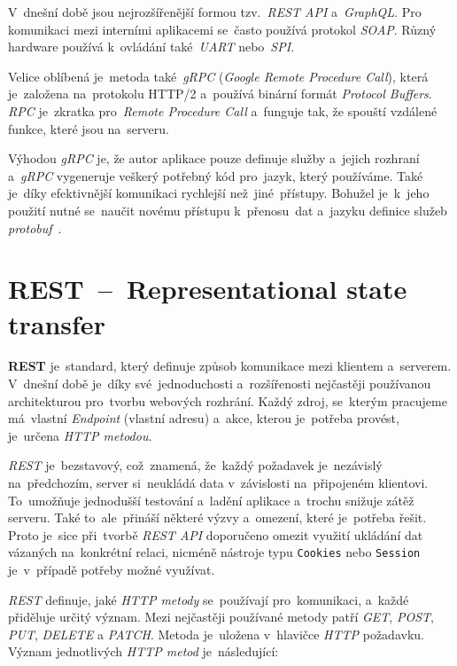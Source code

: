 \documentclass[11pt,a4paper]{report}
\begin{document}
            V~dnešní době jsou nejrozšířenější formou tzv.~\emph{REST API} a~\emph{GraphQL}. Pro komunikaci mezi interními aplikacemi se~často používá protokol \emph{SOAP}. Různý hardware používá k~ovládání také~\emph{UART} nebo~\emph{SPI}.

            Velice oblíbená je~metoda také~\emph{gRPC} (\emph{Google Remote Procedure Call}), která je~založena na~protokolu HTTP/2 a~používá binární formát \emph{Protocol Buffers}. \emph{RPC} je~zkratka pro~\emph{Remote Procedure Call} a~funguje tak, že spouští vzdálené funkce, které jsou na~serveru.
            
            Výhodou \emph{gRPC} je, že autor aplikace pouze definuje služby a~jejich rozhraní a~\emph{gRPC} vygeneruje veškerý potřebný kód pro~jazyk, který používáme. Také je~díky efektivnější komunikaci rychlejší než~jiné~přístupy. Bohužel je~k~jeho použití nutné se~naučit novému přístupu k~přenosu~dat a~jazyku definice služeb \emph{protobuf}~\cite{thenewstackBuildRealWorld}.

        \section{REST~--~Representational state transfer}
            \textbf{REST} je~standard, který definuje způsob komunikace mezi klientem a~serverem. V~dnešní době je~díky své~jednoduchosti a~rozšířenosti nejčastěji používanou architekturou pro~tvorbu webových rozhrání. Každý zdroj, se~kterým pracujeme má~vlastní \emph{Endpoint} (vlastní adresu) a~akce, kterou je~potřeba provést, je~určena \emph{HTTP metodou}.
            
            \emph{REST} je~bezstavový, což~znamená, že~každý požadavek je~nezávislý na~předchozím, server si~neukládá data v~závislosti na~připojeném klientovi. To~umožňuje jednodušší testování a~ladění aplikace a~trochu snižuje zátěž serveru. Také to~ale~přináší některé výzvy a~omezení, které je~potřeba řešit. Proto je~sice při~tvorbě \emph{REST API} doporučeno omezit využití ukládání dat vázaných na~konkrétní relaci, nicméně nástroje typu \texttt{Cookies} nebo \texttt{Session} je~v~případě potřeby možné využívat.
            
            \emph{REST} definuje, jaké \emph{HTTP metody} se~používají pro~komunikaci, a~každé přiděluje určitý význam. Mezi nejčastěji používané metody patří \emph{GET}, \emph{POST}, \emph{PUT}, \emph{DELETE} a \emph{PATCH}. Metoda je~uložena v~hlavičce \emph{HTTP} požadavku. Význam jednotlivých \emph{HTTP metod} je~následující:
            
\end{document}
